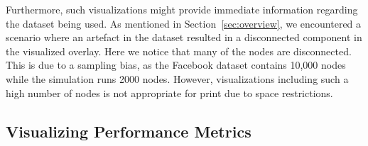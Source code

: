 Furthermore, such visualizations might provide immediate information
regarding the dataset being used. As mentioned in
Section~\ref{sec:overview}, we encountered a scenario where an artefact
in the dataset resulted in a disconnected component in the visualized
overlay. Here we notice that many of the nodes are disconnected. This is
due to a sampling bias, as the Facebook dataset contains 10,000 nodes
while the simulation runs 2000 nodes. However, visualizations including
such a high number of nodes is not appropriate for print due to space
restrictions.

\subsection{Visualizing Performance Metrics}

\begin{figure}[Ht]
    \centering
\end{figure}
